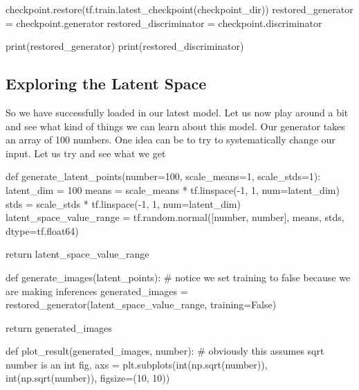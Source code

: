 \documentclass[%
oneside,                 %
final,                   %
10pt]{article}
\begin{document}
\bpycod
checkpoint.restore(tf.train.latest_checkpoint(checkpoint_dir))
restored_generator = checkpoint.generator
restored_discriminator = checkpoint.discriminator

print(restored_generator)
print(restored_discriminator)

\epycod


\subsection{Exploring the Latent Space}

So we have successfully loaded in our latest model. Let us now play around a bit
and see what kind of things we can learn about this model. Our generator takes
an array of 100 numbers. One idea can be to try to systematically change our
input. Let us try and see what we get



















\bpycod
def generate_latent_points(number=100, scale_means=1, scale_stds=1):
    latent_dim = 100
    means = scale_means * tf.linspace(-1, 1, num=latent_dim)
    stds = scale_stds * tf.linspace(-1, 1, num=latent_dim)
    latent_space_value_range = tf.random.normal([number, number],
                                                means,
                                                stds,
                                                dtype=tf.float64)

    return latent_space_value_range

def generate_images(latent_points):
    # notice we set training to false because we are making inferences
    generated_images = restored_generator(latent_space_value_range,
                                          training=False)

    return generated_images

\epycod














\bpycod
def plot_result(generated_images, number):
    # obviously this assumes sqrt number is an int
    fig, axs = plt.subplots(int(np.sqrt(number)), int(np.sqrt(number)),
                            figsize=(10, 10))
\end{document}
